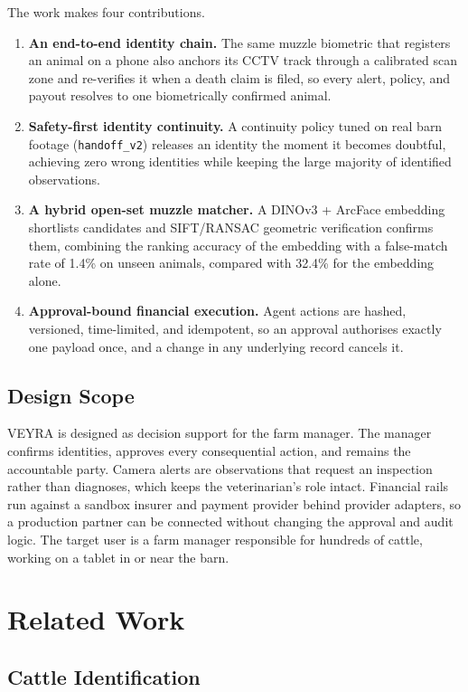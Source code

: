 \documentclass[11pt,letterpaper]{article}
\begin{document}
The work makes four contributions.
\begin{enumerate}[label=(\arabic*)]
\item \textbf{An end-to-end identity chain.} The same muzzle biometric that registers an animal on a phone also anchors its CCTV track through a calibrated scan zone and re-verifies it when a death claim is filed, so every alert, policy, and payout resolves to one biometrically confirmed animal.
\item \textbf{Safety-first identity continuity.} A continuity policy tuned on real barn footage (\texttt{handoff\_v2}) releases an identity the moment it becomes doubtful, achieving zero wrong identities while keeping the large majority of identified observations.
\item \textbf{A hybrid open-set muzzle matcher.} A DINOv3 + ArcFace embedding shortlists candidates and SIFT/RANSAC geometric verification confirms them, combining the ranking accuracy of the embedding with a false-match rate of 1.4\% on unseen animals, compared with 32.4\% for the embedding alone.
\item \textbf{Approval-bound financial execution.} Agent actions are hashed, versioned, time-limited, and idempotent, so an approval authorises exactly one payload once, and a change in any underlying record cancels it.
\end{enumerate}

\subsection{Design Scope}

VEYRA is designed as decision support for the farm manager. The manager confirms identities, approves every consequential action, and remains the accountable party. Camera alerts are observations that request an inspection rather than diagnoses, which keeps the veterinarian's role intact. Financial rails run against a sandbox insurer and payment provider behind provider adapters, so a production partner can be connected without changing the approval and audit logic. The target user is a farm manager responsible for hundreds of cattle, working on a tablet in or near the barn.

\section{Related Work}

\subsection{Cattle Identification}
\end{document}
